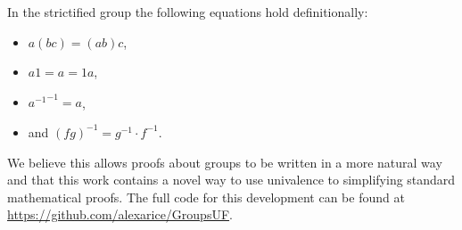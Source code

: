 \documentclass{article}
\begin{document}
In the strictified group the following equations hold definitionally:
\begin{itemize}
\item \(a  (b c) = (a b) c\),
\item \(a 1 = a = 1 a\),
\item \({a^{-1}}^{-1} = a\),
\item and \((f g)^{-1} = g^{-1} \cdot f^{-1}\).
\end{itemize}
We believe this allows proofs about groups to be written in a more natural way and that this work contains a novel way to use univalence to simplifying standard mathematical proofs. The full code for this development can be found at \url{https://github.com/alexarice/GroupsUF}.
\end{document}

